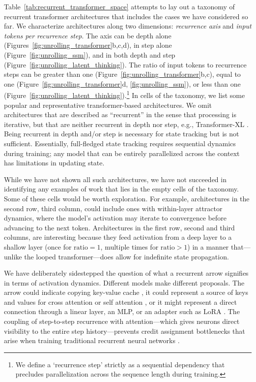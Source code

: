 \documentclass{article}
\begin{document}
Table~\ref{tab:recurrent_transformer_space} attempts to lay out a taxonomy of
recurrent transformer architectures that includes the cases we have considered
so far. We characterize architectures along two dimensions: \emph{recurrence axis} and \emph{input tokens per recurrence step}.  The axis can be depth alone
(Figures~\ref{fig:unrolling_transformer}b,c,d), in step alone
(Figure~\ref{fig:unrolling_ssm}), and in both depth and step
(Figure~\ref{fig:unrolling_latent_thinking}).
The ratio of input tokens to recurrence steps can be greater than one
(Figure~\ref{fig:unrolling_transformer}b,c), equal to one 
(Figure~\ref{fig:unrolling_transformer}d, \ref{fig:unrolling_ssm}), or less
than one (Figure~\ref{fig:unrolling_latent_thinking}).\footnote{We define a `recurrence step' strictly as a sequential dependency that precludes parallelization across the sequence length during training.}
In cells of the 
taxonomy, we list some popular and representative transformer-based architectures. 
We omit architectures that are described as ``recurrent'' in the sense
that processing is iterative, but that are neither recurrent in depth nor
step, e.g., Transformer-XL \citep{dai2019transformerxlattentivelanguagemodels}.
Being recurrent in depth and/or step is necessary for state tracking but is not sufficient.
Essentially, full-fledged state tracking requires sequential dynamics during training; any model that
can be entirely parallelized across the context has limitations in updating state.

While we have not shown all such architectures, we have not succeeded in identifying
any examples of work that lies in the empty cells of the taxonomy. Some of these
cells would be worth exploration.
For example, architectures in the second row, third column, 
could include ones with within-layer attractor dynamics, where the model's 
activation may iterate to convergence before advancing
to the next token. Architectures in the first row, second and third columns, are
interesting because they feed activation from a deep layer to a shallow layer (once 
for $\text{ratio}=1$, multiple times for $\text{ratio}>1$) in a manner that---unlike
the looped  transformer---does allow for indefinite state propagation.

We have deliberately sidestepped the question of what a recurrent arrow signifies
in terms of activation dynamics. Different models make different proposals.
The arrow could indicate copying key-value cache \citep{yang2024kvsharer}, it could represent a source 
of keys and values for cross attention \citep{fan2021} or self attention \citep{oncescu2026}, or it might represent a direct connection through a linear layer,
an MLP, or an adapter such as LoRA \citep{hu2022lora}.
The coupling of step-to-step recurrence with attention---which gives neurons direct visibility to the 
entire  step history---prevents credit assignment bottlenecks that arise when training traditional
recurrent neural networks \citep{Ke2018,oncescu2026}.
\end{document}
